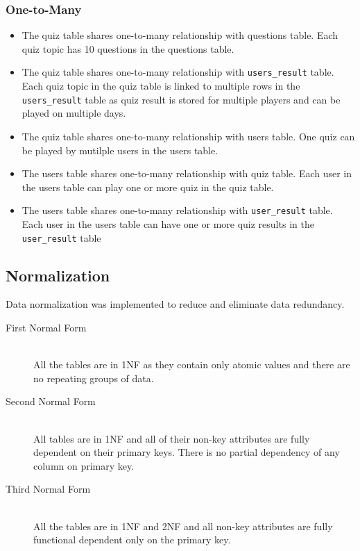 \subsubsection{One-to-Many}
\label{ssub:One-to-Many}

\begin{itemize}

	\item The quiz table shares one-to-many relationship with questions table.
		Each quiz topic has 10 questions in the questions table.

	\item The quiz table shares one-to-many relationship with
	\verb+users_result+ table. Each quiz topic in the quiz table is linked to
	multiple rows in the \verb+users_result+ table as quiz result is stored for
	multiple players and can be played on multiple days.

	\item The quiz table shares one-to-many relationship with users table. One
		quiz can be played by mutilple users in the users table.

	\item The users table shares one-to-many relationship with quiz table. Each
		user in the users table can play one or more quiz in the quiz table.

	\item The users table shares one-to-many relationship with
	\verb+user_result+ table. Each user in the users table can have one or more
	quiz results in the \verb+user_result+ table

\end{itemize}

\subsection{Normalization}
\label{sub:normalization}

Data normalization was implemented to reduce and eliminate data redundancy.

\begin{description}

	\item[First Normal Form]  \hfill \\ All the tables are in 1NF as they
		contain only atomic values and there are no repeating groups of data.

	\item[Second Normal Form]  \hfill \\ All tables are in 1NF and all of their
		non-key attributes are fully dependent on their primary keys.  There is
		no partial dependency of any column on primary key.

	\item[Third Normal Form]  \hfill \\ All the tables are in 1NF and 2NF and
		all non-key attributes are fully functional dependent only on the
		primary key.

\end{description}
